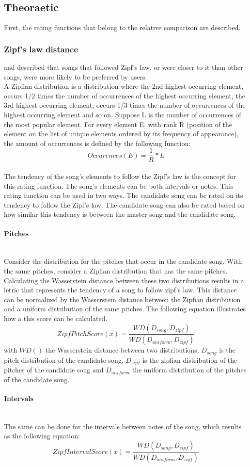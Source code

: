 \subsection{Theoraetic}
First, the rating functions that belong to the relative comparison are described.
\subsubsection{Zipf's law distance}
\cite{Zipfslaw_paper} and \cite{Zipfslaw_paper2} described that songs that followed Zipf's law, or were closer to it than other songs, were more likely to be preferred by users. 
\\
A Zipfian distribution is a distribution where the 2nd highest occurring element, occurs 1/2 times the number of occurrences of the highest occurring element, the 3rd highest occurring element, occurs 1/3 times the number of occurrences of the highest occurring element and so on. Suppose L is the number of occurrences of the most popular element. For every element E, with rank R (position of the element on the list of unique elements ordered by its frequency of appearance), the amount of occurrences is defined by the following function:
\[ Occurences(E) =  \frac{1}{R} * L  \]
\\
The tendency of the song's elements to follow the Zipf's law is the concept for this rating function. The song's elements can be both intervals or notes. This rating function can be used in two ways. The candidate song can be rated on its tendency to follow the Zipf's law. The candidate song can also be rated based on how similar this tendency is between the master song and the candidate song.

\paragraph{Pitches}\mbox{}\\
Consider the distribution for the pitches that occur in the candidate song. With the same pitches, consider a Zipfian distribution that has the same pitches. Calculating the Wasserstein distance between these two distributions results in a letric that represents the tendency of a song to follow zipf's law. This distance can be normalized by the Wasserstein distance between the Zipfian distribution and a uniform distribution of the same pitches. The following equation illustrates how a this score can be calculated.
\[ ZipfPitchScore(x) =  \frac{WD(D_{song},D_{zipf})}{WD(D_{uniform},D_{zipf})} \]with $WD()$ the Wasserstein distance between two distributions, $D_{song}$ is the pitch distribution of the candidate song, $D_{zipf}$ is the zipfian distribution of the pitches of the candidate song and $D_{uniform}$ the uniform distribution of the pitches of the candidate song.
\paragraph{Intervals}\mbox{}\\
The same can be done for the intervals between notes of the song, which results as the following equation:
\[ ZipfIntervalScore(x) = \frac{WD(D_{song},D_{zipf})}{WD(D_{uniform},D_{zipf})}\]